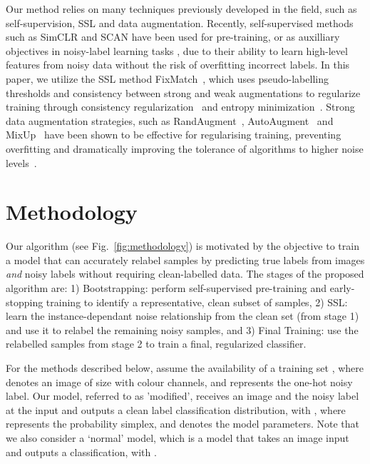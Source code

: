 \documentclass[10pt,twocolumn,letterpaper]{article}
\begin{document}
Our method relies on many techniques previously developed in the field, such as self-supervision, SSL and data augmentation. Recently, self-supervised methods such as SimCLR \cite{chen2020simple, chen2020big} and SCAN \cite{van2020scan} have been used for pre-training, or as auxilliary objectives in noisy-label learning tasks \cite{zheltonozhskii2022contrast, sachdeva2021scanmix}, due to their ability to learn high-level features from noisy data without the risk of overfitting incorrect labels. 
In this paper, we utilize the SSL method FixMatch~\cite{sohn2020fixmatch}, which uses pseudo-labelling thresholds and consistency between strong and weak augmentations to regularize training through consistency regularization~\cite{bachman2014learning, tarvainen2017mean, Laine2017TemporalEF} and entropy minimization~\cite{grandvalet2004semi, lee2013pseudo}.
Strong data augmentation strategies, such as RandAugment~\cite{cubuk2020randaugment}, AutoAugment~\cite{cubuk2019autoaugment} and MixUp~\cite{zhang2018mixup} have been shown to be effective for regularising training, preventing overfitting and dramatically improving the tolerance of algorithms to higher noise levels~\cite{Nishi_2021_CVPR, li2020dividemix, arazo2019unsupervised}.



\section{Methodology}
\label{sec:methodology}

Our algorithm (see Fig.~\ref{fig:methodology}) is motivated by the objective to train a model that can accurately relabel samples by predicting true labels from images \textit{and} noisy labels without requiring clean-labelled data. The stages of the proposed algorithm are: 1) Bootstrapping: perform self-supervised pre-training and early-stopping training to identify a representative, clean subset of samples, 2) SSL: learn the instance-dependant noise relationship from the clean set (from stage 1) and use it to relabel the remaining noisy samples, and 3) Final Training: use the relabelled samples from stage 2 to train a final, regularized classifier.

For the methods described below, assume the availability of a training set , where  denotes an image of size  with  colour channels, and  represents the one-hot noisy label.
Our model, referred to as 'modified', receives an image and the noisy label at the input and outputs a clean label classification distribution, with , where  represents the  probability simplex, and  denotes the model parameters. Note that we also consider a `normal' model, which is a model that takes an image input and outputs a classification, with .
\end{document}
